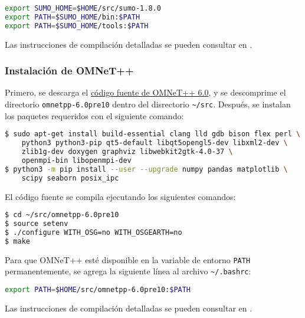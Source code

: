 \begin{lstlisting}[language=bash]
export SUMO_HOME=$HOME/src/sumo-1.8.0
export PATH=$SUMO_HOME/bin:$PATH
export PATH=$SUMO_HOME/tools:$PATH
\end{lstlisting}

Las instrucciones de compilación detalladas se pueden consultar en
\cite{CompilacionSUMO}.


\subsubsection{Instalación de OMNeT++}
\label{subsubsec:instalacion_omnet}

Primero, se descarga el \href{https://omnetpp.org/download/}{código fuente de
OMNeT++ 6.0}, y se descomprime el directorio
{\lstinline[language=bash]!omnetpp-6.0pre10!} dentro del disrectorio
{\lstinline[language=bash]!~/src!}. Después, se instalan los paquetes
requeridos con el siguiente comando:

\begin{lstlisting}[language=bash]
$ sudo apt-get install build-essential clang lld gdb bison flex perl \
    python3 python3-pip qt5-default libqt5opengl5-dev libxml2-dev \
    zlib1g-dev doxygen graphviz libwebkit2gtk-4.0-37 \
    openmpi-bin libopenmpi-dev
$ python3 -m pip install --user --upgrade numpy pandas matplotlib \
    scipy seaborn posix_ipc
\end{lstlisting}

El código fuente se compila ejecutando los siguientes comandos:

\begin{lstlisting}[language=bash]
$ cd ~/src/omnetpp-6.0pre10
$ source setenv
$ ./configure WITH_OSG=no WITH_OSGEARTH=no
$ make
\end{lstlisting}

Para que OMNeT++ esté disponible en la variable de entorno
{\lstinline[language=bash]!PATH!} permanentemente, se agrega la siguiente línea
al archivo {\lstinline[language=bash]!~/.bashrc!}:

\begin{lstlisting}[language=bash]
export PATH=$HOME/src/omnetpp-6.0pre10:$PATH
\end{lstlisting}

Las instrucciones de compilación detalladas se pueden consultar en
\cite{CompilacionOMNeT}.

